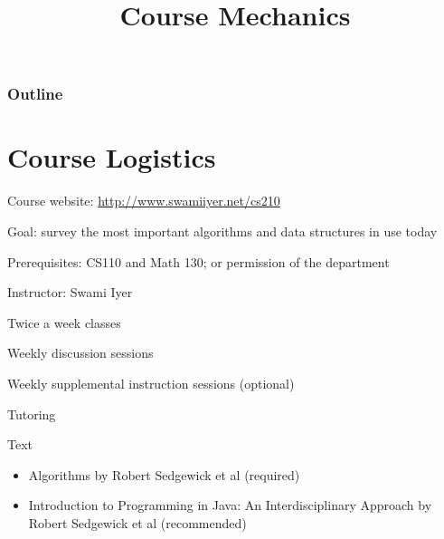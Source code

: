 \documentclass[8pt,a4paper,compress]{beamer}
\title{Course Mechanics}
\date{}
\begin{document}
\begin{frame}
\vfill
\titlepage
\end{frame}

\begin{frame}
\frametitle{Outline}
\tableofcontents
\end{frame}

\section{Course Logistics}
\begin{frame}[fragile]
\pause

Course website: \href{http://www.swamiiyer.net/cs210}{http://www.swamiiyer.net/cs210}

\pause
\bigskip

Goal: survey the most important algorithms and data structures in use today

\pause
\bigskip

Prerequisites: CS110 and Math 130; or permission of the department

\pause
\bigskip

Instructor: Swami Iyer

\pause
\bigskip

Twice a week classes

\pause
\bigskip
Weekly discussion sessions

\pause
\bigskip

Weekly supplemental instruction sessions (optional)

\pause
\bigskip

Tutoring

\pause
\bigskip

Text
\begin{itemize}
\item Algorithms by Robert Sedgewick et al (required)
\item Introduction to Programming in Java: An Interdisciplinary Approach  by Robert Sedgewick et al (recommended)
\end{itemize}
\end{frame}
\end{document}
